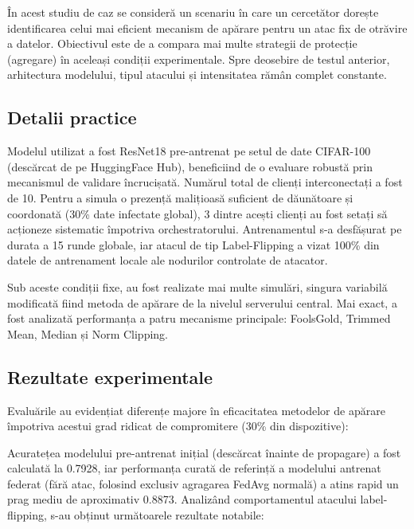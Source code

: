 \documentclass[../../main.tex]{subfiles}
\begin{document}
        În acest studiu de caz se consideră un scenariu în care un cercetător dorește identificarea celui mai eficient mecanism de apărare pentru un atac fix de otrăvire a datelor. Obiectivul este de a compara mai multe strategii de protecție (agregare) în aceleași condiții experimentale. Spre deosebire de testul anterior, arhitectura modelului, tipul atacului și intensitatea rămân complet constante.

        \subsection{Detalii practice}
        Modelul utilizat a fost ResNet18 pre-antrenat pe setul de date CIFAR-100 (descărcat de pe HuggingFace Hub), beneficiind de o evaluare robustă prin mecanismul de validare încrucișată. Numărul total de clienți interconectați a fost de 10. Pentru a simula o prezență malițioasă suficient de dăunătoare și coordonată (30\% date infectate global), 3 dintre acești clienți au fost setați să acționeze sistematic împotriva orchestratorului. Antrenamentul s-a desfășurat pe durata a 15 runde globale, iar atacul de tip Label-Flipping a vizat 100\% din datele de antrenament locale ale nodurilor controlate de atacator.

        Sub aceste condiții fixe, au fost realizate mai multe simulări, singura variabilă modificată fiind metoda de apărare de la nivelul serverului central. Mai exact, a fost analizată performanța a patru mecanisme principale: FoolsGold, Trimmed Mean, Median și Norm Clipping.

        \subsection{Rezultate experimentale}
        Evaluările au evidențiat diferențe majore în eficacitatea metodelor de apărare împotriva acestui grad ridicat de compromitere (30\% din dispozitive):

        Acuratețea modelului pre-antrenat inițial (descărcat înainte de propagare) a fost calculată la 0.7928, iar performanța curată de referință a modelului antrenat federat (fără atac, folosind exclusiv agragarea FedAvg normală) a atins rapid un prag mediu de aproximativ 0.8873. Analizând comportamentul atacului label-flipping, s-au obținut următoarele rezultate notabile:
\end{document}
